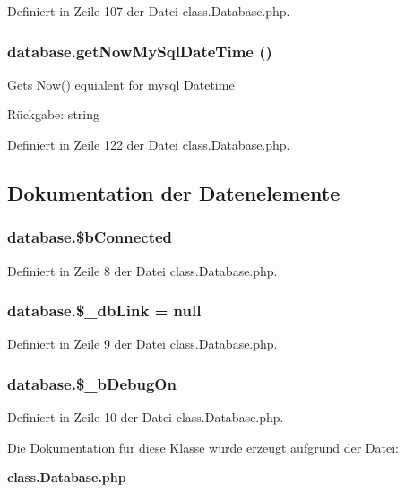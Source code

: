 Definiert in Zeile 107 der Datei class.Database.php.
\subsubsection{\setlength{\rightskip}{0pt plus 5cm}database.getNowMySqlDateTime ()}\label{classdatabase_04baa039a08e4d2b3dfb1e6b511ef81e}


Gets Now() equialent for mysql Datetime

\begin{Desc}
\item[Rückgabe:]string \end{Desc}


Definiert in Zeile 122 der Datei class.Database.php.

\subsection{Dokumentation der Datenelemente}
\subsubsection{\setlength{\rightskip}{0pt plus 5cm}database.\$bConnected}\label{classdatabase_de2a130214292efb93e54cb52d724b88}




Definiert in Zeile 8 der Datei class.Database.php.
\subsubsection{\setlength{\rightskip}{0pt plus 5cm}database.\$\_\-dbLink = null}\label{classdatabase_63ab462001e4a9f376b8a7ce9678bd31}




Definiert in Zeile 9 der Datei class.Database.php.
\subsubsection{\setlength{\rightskip}{0pt plus 5cm}database.\$\_\-bDebugOn}\label{classdatabase_1502c24fccc5fd715d6766b623835877}




Definiert in Zeile 10 der Datei class.Database.php.

Die Dokumentation für diese Klasse wurde erzeugt aufgrund der Datei:\begin{CompactItemize}
\item 
{\bf class.Database.php}\end{CompactItemize}
